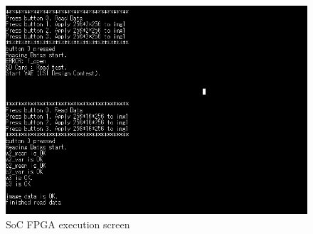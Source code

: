\documentclass[conference]{IEEEtran}
\begin{document}
\begin{figure}
  \begin{center}
    \includegraphics[width=0.98\columnwidth]{figures/Ex_re7.png}
  \end{center}
  \caption{SoC FPGA execution screen}
  \label{fig:3-1}
\end{figure}
\end{document}
